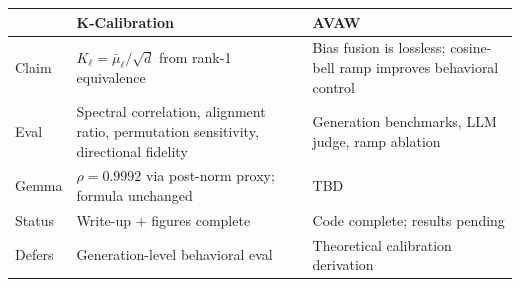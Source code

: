 \documentclass[11pt,a4paper]{article}
\begin{document}
\begin{center}\small
\begin{tabular}{p{3cm}p{5cm}p{5cm}}
\toprule
 & \textbf{K-Calibration} & \textbf{AVAW} \\
\midrule
Claim & $K_\ell = \bar{\mu}_\ell/\sqrt{d}$ from rank-1 equivalence & Bias fusion is lossless; cosine-bell ramp improves behavioral control \\
Eval & Spectral correlation, alignment ratio, permutation sensitivity, directional fidelity & Generation benchmarks, LLM judge, ramp ablation \\
Gemma & $\rho{=}0.9992$ via post-norm proxy; formula unchanged & TBD \\
Status & Write-up + figures complete & Code complete; results pending \\
Defers & Generation-level behavioral eval & Theoretical calibration derivation \\
\bottomrule
\end{tabular}
\end{center}
\end{document}
